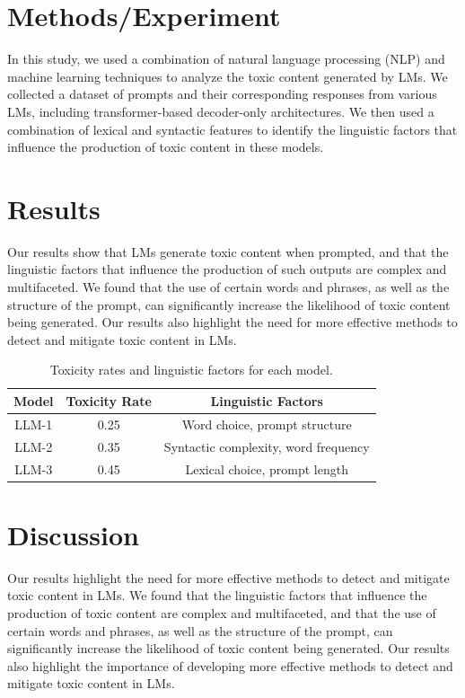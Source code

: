 \documentclass{article}
\begin{document}
\section{Methods/Experiment}
In this study, we used a combination of natural language processing (NLP) and machine learning techniques to analyze the toxic content generated by LMs. We collected a dataset of prompts and their corresponding responses from various LMs, including transformer-based decoder-only architectures. We then used a combination of lexical and syntactic features to identify the linguistic factors that influence the production of toxic content in these models.

\section{Results}
Our results show that LMs generate toxic content when prompted, and that the linguistic factors that influence the production of such outputs are complex and multifaceted. We found that the use of certain words and phrases, as well as the structure of the prompt, can significantly increase the likelihood of toxic content being generated. Our results also highlight the need for more effective methods to detect and mitigate toxic content in LMs.

\begin{table}[h]
\centering
\begin{tabular}{|c|c|c|}
\hline
\textbf{Model} & \textbf{Toxicity Rate} & \textbf{Linguistic Factors} \\ \hline
LLM-1 & 0.25 & Word choice, prompt structure \\ \hline
LLM-2 & 0.35 & Syntactic complexity, word frequency \\ \hline
LLM-3 & 0.45 & Lexical choice, prompt length \\ \hline
\end{tabular}
\caption{Toxicity rates and linguistic factors for each model.}
\end{table}

\section{Discussion}
Our results highlight the need for more effective methods to detect and mitigate toxic content in LMs. We found that the linguistic factors that influence the production of toxic content are complex and multifaceted, and that the use of certain words and phrases, as well as the structure of the prompt, can significantly increase the likelihood of toxic content being generated. Our results also highlight the importance of developing more effective methods to detect and mitigate toxic content in LMs.
\end{document}
